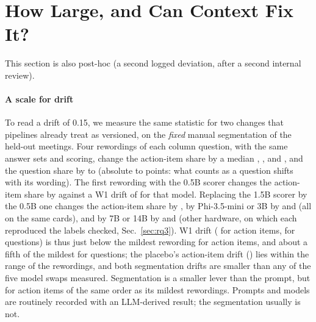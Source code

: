 \documentclass[conference]{IEEEtran}
\begin{document}
\section{How Large, and Can Context Fix It?}\label{sec:calib}
This section is also post-hoc (a second logged deviation, after a second internal review).
\paragraph*{A scale for drift} To read a drift of 0.15, we measure the same statistic for two changes that pipelines
already treat as versioned, on the \emph{fixed} manual segmentation of the held-out meetings. Four rewordings of each
column question, with the same answer sets and scoring, change the action-item share by a median \nCalParaDQonemed,
\nCalParaQonemed, \nCalParaBQonemed{} and \nCalParaCQonemed{}, and the question share by \nCalParaBQtwomed{} to
\nCalParaCQtwomed{} (absolute \nCalParaBQtwoabs{} to \nCalParaCQtwoabs{} points: what counts as a question shifts with
its wording). The first rewording with the 0.5B scorer changes the action-item share by \nCalParaHalfQonemed{}
against a W1 drift of \nWoneQoneMtwomed{} for that model. Replacing the 1.5B scorer by the 0.5B one changes the action-item share by
\nCalSwapHalfQonemed, by Phi-3.5-mini or 3B by \nCalSwapPhiQonemed{} and \nCalSwapThreeQonemed{} (all on the same
cards), and by 7B or 14B by \nCalSwapSevenQonemed{} and \nCalSwapFourteenQonemed{} (other hardware, on which each
reproduced the labels checked, Sec.~\ref{sec:rq3}). W1 drift (\nHonemed{} for action items,
\nWoneQtwomed{} for questions) is thus just below the mildest rewording for action items, and about a fifth of the
mildest for questions; the placebo's action-item drift (\nHtwomed) lies within the range of the rewordings, and both
segmentation drifts are smaller than any of the five model swaps measured. Segmentation is a smaller lever than the prompt, but for action items of the
same order as its mildest rewordings. Prompts and models are routinely recorded with an LLM-derived
result; the segmentation usually is not.
\end{document}
